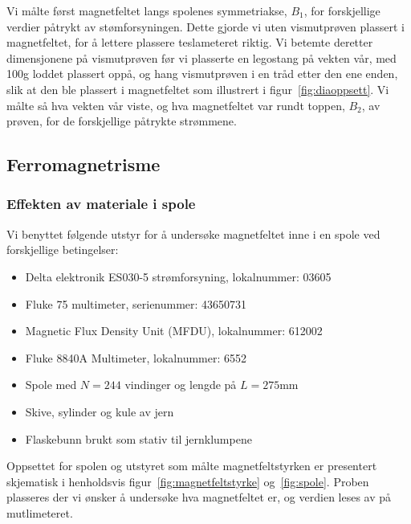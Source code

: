 \documentclass[a4paper,11pt, twocolumn]{article}
\begin{document}
Vi målte først magnetfeltet langs spolenes symmetriakse, $B_1$, for forskjellige verdier påtrykt av stømforsyningen. Dette gjorde vi uten vismutprøven plassert i magnetfeltet, for å lettere plassere teslameteret riktig. Vi betemte deretter dimensjonene på vismutprøven før vi plasserte en legostang på vekten vår, med 100g loddet plassert oppå, og hang vismutprøven i en tråd etter den ene enden, slik at den ble plassert i magnetfeltet som illustrert i figur~\ref{fig:diaoppsett}. Vi målte så hva vekten vår viste, og hva magnetfeltet var rundt toppen, $B_2$, av prøven, for de forskjellige påtrykte strømmene.
\subsection{Ferromagnetrisme}

\subsubsection{Effekten av materiale i spole}
Vi benyttet følgende utstyr for å undersøke magnetfeltet inne i en spole ved forskjellige betingelser:
\begin{itemize}
	\item Delta elektronik ES030-5 strømforsyning, lokalnummer: 03605
	\item Fluke 75 multimeter, serienummer: 43650731
	\item Magnetic Flux Density Unit (MFDU), lokalnummer: 612002
	\item Fluke 8840A Multimeter, lokalnummer: 6552
	\item Spole med $N=244$ vindinger og lengde på $L=275$mm
	\item Skive, sylinder og kule av jern
	\item Flaskebunn brukt som stativ til jernklumpene
\end{itemize}
Oppsettet for spolen og utstyret som målte magnetfeltstyrken er presentert skjematisk i henholdsvis figur~\ref{fig:magnetfeltstyrke} og~\ref{fig:spole}. Proben plasseres der vi ønsker å undersøke hva magnetfeltet er, og verdien leses av på mutlimeteret.
\end{document}
